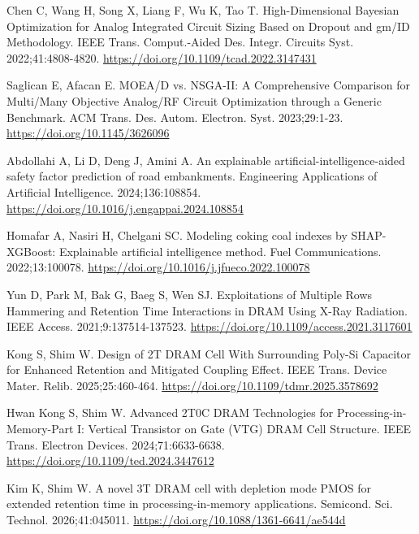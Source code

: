 Chen C, Wang H, Song X, Liang F, Wu K, Tao T. High-Dimensional Bayesian Optimization for Analog Integrated Circuit Sizing Based on Dropout and gm/ID Methodology. IEEE Trans. Comput.-Aided Des. Integr. Circuits Syst. 2022;41:4808-4820.
\href{https://doi.org/10.1109/tcad.2022.3147431}{https://doi.org/10.1109/tcad.2022.3147431}

Saglican E, Afacan E. MOEA/D vs. NSGA-II: A Comprehensive Comparison for Multi/Many Objective Analog/RF Circuit Optimization through a Generic Benchmark. ACM Trans. Des. Autom. Electron. Syst. 2023;29:1-23.
\href{https://doi.org/10.1145/3626096}{https://doi.org/10.1145/3626096}

Abdollahi A, Li D, Deng J, Amini A. An explainable artificial-intelligence-aided safety factor prediction of road embankments. Engineering Applications of Artificial Intelligence. 2024;136:108854.
\href{https://doi.org/10.1016/j.engappai.2024.108854}{https://doi.org/10.1016/j.engappai.2024.108854}

Homafar A, Nasiri H, Chelgani SC. Modeling coking coal indexes by SHAP-XGBoost: Explainable artificial intelligence method. Fuel Communications. 2022;13:100078.
\href{https://doi.org/10.1016/j.jfueco.2022.100078}{https://doi.org/10.1016/j.jfueco.2022.100078}

Yun D, Park M, Bak G, Baeg S, Wen SJ. Exploitations of Multiple Rows Hammering and Retention Time Interactions in DRAM Using X-Ray Radiation. IEEE Access. 2021;9:137514-137523.
\href{https://doi.org/10.1109/access.2021.3117601}{https://doi.org/10.1109/access.2021.3117601}

Kong S, Shim W. Design of 2T DRAM Cell With Surrounding Poly-Si Capacitor for Enhanced Retention and Mitigated Coupling Effect. IEEE Trans. Device Mater. Relib. 2025;25:460-464.
\href{https://doi.org/10.1109/tdmr.2025.3578692}{https://doi.org/10.1109/tdmr.2025.3578692}

Hwan Kong S, Shim W. Advanced 2T0C DRAM Technologies for Processing-in-Memory-Part I: Vertical Transistor on Gate (VTG) DRAM Cell Structure. IEEE Trans. Electron Devices. 2024;71:6633-6638.
\href{https://doi.org/10.1109/ted.2024.3447612}{https://doi.org/10.1109/ted.2024.3447612}

Kim K, Shim W. A novel 3T DRAM cell with depletion mode PMOS for extended retention time in processing-in-memory applications. Semicond. Sci. Technol. 2026;41:045011.
\href{https://doi.org/10.1088/1361-6641/ae544d}{https://doi.org/10.1088/1361-6641/ae544d}

